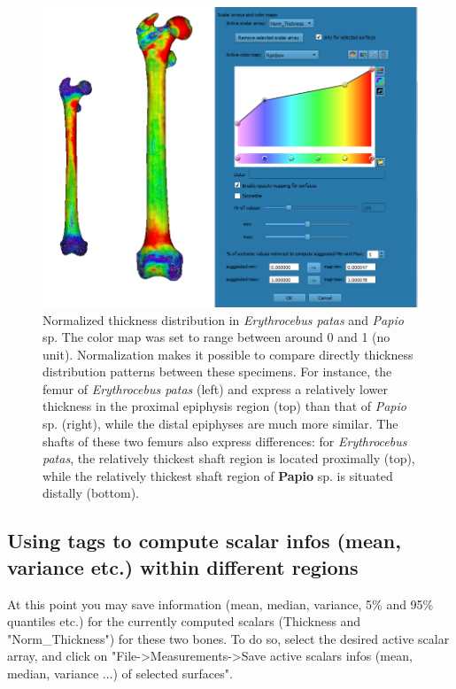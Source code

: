 \documentclass[12pt, a4paper]{book}
\begin{document}
\begin{figure}
  \centering
  \includegraphics[scale=0.45]{NormThickness.png}
\caption{Normalized thickness distribution in \textit{Erythrocebus patas} and \textit{Papio} sp. The color map was set to range between around 0 and 1 (no unit). Normalization makes it possible to compare directly thickness distribution patterns between these specimens. For instance, the femur of \textit{Erythrocebus patas} (left) and express a relatively lower thickness in the proximal epiphysis  region (top) than  that of \textit{Papio} sp. (right), while the distal epiphyses are much more similar. The shafts of these two femurs also express differences: for \textit{Erythrocebus patas}, the relatively thickest shaft region is located proximally (top), while the relatively thickest shaft region of \textbf{Papio} sp. is situated distally (bottom). }	
\label{normthickness}
 \end{figure}

\subsection{Using tags to compute scalar infos (mean, variance etc.) within different regions}
At this point you may save information (mean, median, variance, 5\% and 95\% quantiles etc.) for the currently computed scalars (Thickness and "Norm\_Thickness") for these two bones. To do so, select the desired active scalar array, and click on "File->Measurements->Save active scalars infos (mean, median, variance ...) of selected surfaces". \\
\end{document}
